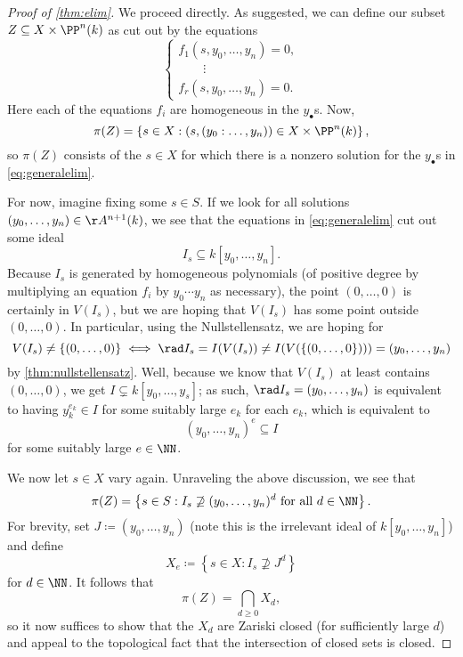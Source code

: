 \documentclass[../notes.tex]{subfiles}
\begin{document}
\begin{proof}[Proof of \autoref{thm:elim}]
	We proceed directly. As suggested, we can define our subset $Z\subseteq X\times\PP^n(k)$ as cut out by the equations
	\[\begin{cases}
		f_1(s,y_0,\ldots,y_n)=0, \\
		\quad\quad\vdots \\
		f_r(s,y_0,\ldots,y_n)=0.
	\end{cases}\tag{3}\label{eq:generalelim}\]
	Here each of the equations $f_i$ are homogeneous in the $y_\bullet$s. Now,
	\[\pi(Z)=\left\{s\in X:(s,(y_0:\ldots,y_n))\in X\times\PP^n(k)\right\},\]
	so $\pi(Z)$ consists of the $s\in X$ for which there is a nonzero solution for the $y_\bullet$s in \autoref{eq:generalelim}.
	
	For now, imagine fixing some $s\in S$. If we look for all solutions $(y_0,\ldots,y_n)\in\AA^{n+1}(k)$, we see that the equations in \autoref{eq:generalelim} cut out some ideal
	\[I_s\subseteq k[y_0,\ldots,y_n].\]
	Because $I_s$ is generated by homogeneous polynomials (of positive degree by multiplying an equation $f_i$ by $y_0\cdots y_n$ as necessary), the point $(0,\ldots,0)$ is certainly in $V(I_s)$, but we are hoping that $V(I_s)$ has some point outside $(0,\ldots,0)$. In particular, using the Nullstellensatz, we are hoping for
	\[V(I_s)\ne\{(0,\ldots,0)\}\iff\rad I_s=I(V(I_s))\ne I(V(\{(0,\ldots,0\})))=(y_0,\ldots,y_n)\]
	by \autoref{thm:nullstellensatz}. Well, because we know that $V(I_s)$ at least contains $(0,\ldots,0)$, we get $I\subsetneq k[y_0,\ldots,y_s]$; as such, $\rad I_s=(y_0,\ldots,y_n)$ is equivalent to having $y_k^{e_k}\in I$ for some suitably large $e_k$ for each $e_k$, which is equivalent to
	\[(y_0,\ldots,y_n)^e\subseteq I\]
	for some suitably large $e\in\NN$.

	We now let $s\in X$ vary again. Unraveling the above discussion, we see that
	\[\pi(Z)=\left\{s\in S:I_s\not\supseteq(y_0,\ldots,y_n)^d\text{ for all }d\in\NN\right\}.\]
	For brevity, set $J\coloneqq(y_0,\ldots,y_n)$ (note this is the irrelevant ideal of $k[y_0,\ldots,y_n]$) and define
	\[X_e\coloneqq\left\{s\in X:I_s\not\supseteq J^d\right\}\]
	for $d\in\NN$. It follows that
	\[\pi(Z)=\bigcap_{d\ge0}X_d,\]
	so it now suffices to show that the $X_d$ are Zariski closed (for sufficiently large $d$) and appeal to the topological fact that the intersection of closed sets is closed.


\end{proof}
\end{document}
